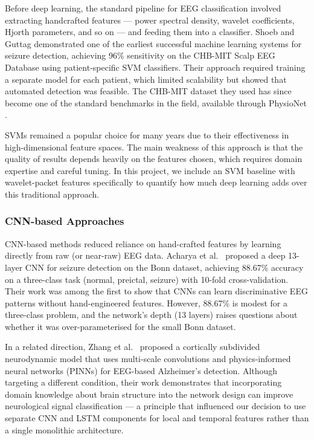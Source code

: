 Before deep learning, the standard pipeline for EEG classification involved extracting handcrafted features --- power spectral density, wavelet coefficients, Hjorth parameters, and so on --- and feeding them into a classifier. Shoeb and Guttag \cite{shoeb2010} demonstrated one of the earliest successful machine learning systems for seizure detection, achieving 96\% sensitivity on the CHB-MIT Scalp EEG Database using patient-specific SVM classifiers. Their approach required training a separate model for each patient, which limited scalability but showed that automated detection was feasible. The CHB-MIT dataset they used has since become one of the standard benchmarks in the field, available through PhysioNet \cite{goldberger2000}.

SVMs remained a popular choice for many years due to their effectiveness in high-dimensional feature spaces. The main weakness of this approach is that the quality of results depends heavily on the features chosen, which requires domain expertise and careful tuning. In this project, we include an SVM baseline with wavelet-packet features specifically to quantify how much deep learning adds over this traditional approach.

\subsubsection{CNN-based Approaches}

CNN-based methods reduced reliance on hand-crafted features by learning directly from raw (or near-raw) EEG data. Acharya et al.\ \cite{acharya2018} proposed a deep 13-layer CNN for seizure detection on the Bonn dataset, achieving 88.67\% accuracy on a three-class task (normal, preictal, seizure) with 10-fold cross-validation. Their work was among the first to show that CNNs can learn discriminative EEG patterns without hand-engineered features. However, 88.67\% is modest for a three-class problem, and the network's depth (13 layers) raises questions about whether it was over-parameterised for the small Bonn dataset.

In a related direction, Zhang et al.\ \cite{zhang2026} proposed a cortically subdivided neurodynamic model that uses multi-scale convolutions and physics-informed neural networks (PINNs) for EEG-based Alzheimer's detection. Although targeting a different condition, their work demonstrates that incorporating domain knowledge about brain structure into the network design can improve neurological signal classification --- a principle that influenced our decision to use separate CNN and LSTM components for local and temporal features rather than a single monolithic architecture.

